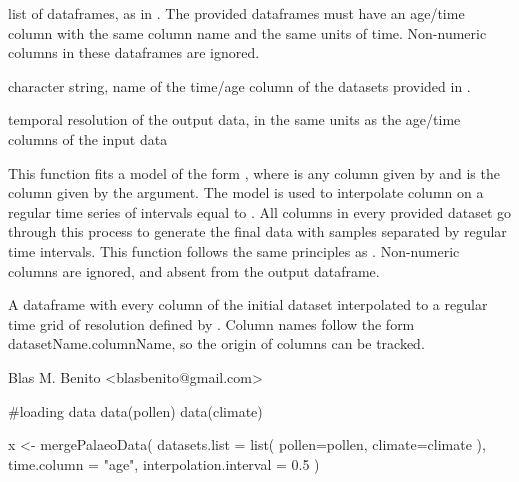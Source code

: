 \documentclass[letterpaper]{book}
\begin{document}
\begin{Arguments}
\begin{ldescription}
\item[\code{datasets.list}] list of dataframes, as in . The provided dataframes must have an age/time column with the same column name and the same units of time. Non-numeric columns in these dataframes are ignored.

\item[\code{time.column}] character string, name of the time/age column of the datasets provided in .

\item[\code{interpolation.interval}] temporal resolution of the output data, in the same units as the age/time columns of the input data
\end{ldescription}
\end{Arguments}
%
\begin{Details}\relax
This function fits a  model of the form , where  is any column given by  and  is the column given by the  argument. The model is used to interpolate column  on a regular time series of intervals equal to . All columns in every provided dataset go through this process to generate the final data with samples separated by regular time intervals. This function follows the same principles as . Non-numeric columns are ignored, and absent from the output dataframe.
\end{Details}
%
\begin{Value}
A dataframe with every column of the initial dataset interpolated to a regular time grid of resolution defined by . Column names follow the form datasetName.columnName, so the origin of columns can be tracked.
\end{Value}
%
\begin{Author}\relax
Blas M. Benito  <blasbenito@gmail.com>
\end{Author}
%
\begin{SeeAlso}\relax
{}
\end{SeeAlso}
%
\begin{Examples}
\begin{ExampleCode}
#loading data
data(pollen)
data(climate)

x <- mergePalaeoData(
 datasets.list = list(
   pollen=pollen,
   climate=climate
 ),
 time.column = "age",
 interpolation.interval = 0.5
 )

\end{ExampleCode}
\end{Examples}
\end{document}
